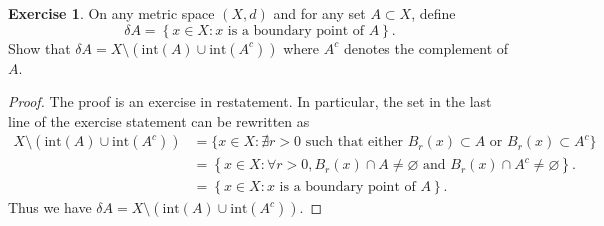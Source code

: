 \documentclass[12pt]{article}
\theoremstyle{definition}
\newtheorem{ex}{Exercise}
\begin{document}
\begin{ex}
	On any metric space $(X, d)$ and for any set $A \subset X$, define \begin{equation*}
		\delta A = \left\lbrace x \in X : x \text{ is a boundary point of } A \right\rbrace.
	\end{equation*}
	Show that $\delta A = X \setminus (\mathrm{int}(A) \cup \mathrm{int}(A^c))$ where $A^c$ denotes the complement of $A$.
\end{ex}
\begin{proof}
	The proof is an exercise in restatement.
	In particular, the set in the last line of the exercise statement can be rewritten as \begin{align*}
		X \setminus (\mathrm{int}(A) \cup \mathrm{int}(A^c)) & = \lbrace x \in X : \nexists r > 0 \text{ such that either } B_r(x) \subset A \text{ or } B_r(x) \subset A^c \rbrace                \\
		                                                     & = \left\lbrace x \in X : \forall r > 0, B_r(x) \cap A \neq \varnothing \text{ and } B_r(x) \cap A^c \neq \varnothing \right\rbrace. \\
		                                                     & = \left\lbrace x \in X : x \text{ is a boundary point of } A \right\rbrace.
	\end{align*}
	Thus we have $\delta A = X \setminus (\mathrm{int}(A) \cup \mathrm{int}(A^c))$.
\end{proof}
\end{document}
